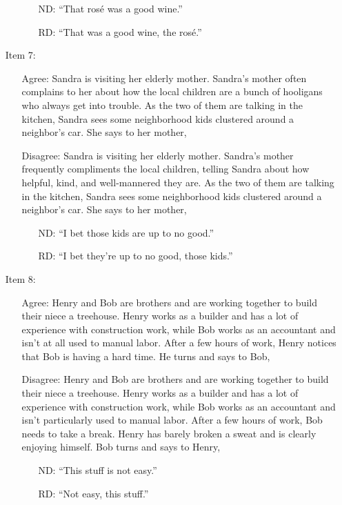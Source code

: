 \documentclass[titlepage,12pt]{article}
\begin{document}
\begin{appendices}
\begin{enumerate}
\begin{enumerate}
        \begin{itemize}
        \setlength{\itemindent}{5em}
            \item [ND:] ``That rosé was a good wine.''
            \item [RD:] ``That was a good wine, the rosé.''
        \end{itemize}
    \end{enumerate}
    \item [Item 7:]\hfill \begin{enumerate}
        \item [Agree:] Sandra is visiting her elderly mother. Sandra's mother often complains to her about how the local children are a bunch of hooligans who always get into trouble. As the two of them are talking in the kitchen, Sandra sees some neighborhood kids clustered around a neighbor's car. She says to her mother,
        \item [Disagree:] Sandra is visiting her elderly mother. Sandra's mother frequently compliments the local children, telling Sandra about how helpful, kind, and well-mannered they are. As the two of them are talking in the kitchen, Sandra sees some neighborhood kids clustered around a neighbor's car. She says to her mother,
        \begin{itemize}
        \setlength{\itemindent}{5em}
            \item [ND:] ``I bet those kids are up to no good.''
            \item [RD:] ``I bet they're up to no good, those kids.''
        \end{itemize}
    \end{enumerate}
    \item [Item 8:]\hfill 
    \begin{enumerate}
        \item [Agree:] Henry and Bob are brothers and are working together to build their niece a treehouse. Henry works as a builder and has a lot of experience with construction work, while Bob works as an accountant and isn't at all used to manual labor. After a few hours of work, Henry notices that Bob is having a hard time. He turns and says to Bob,
        \item [Disagree:] Henry and Bob are brothers and are working together to build their niece a treehouse. Henry works as a builder and has a lot of experience with construction work, while Bob works as an accountant and isn't particularly used to manual labor. After a few hours of work, Bob needs to take a break. Henry has barely broken a sweat and is clearly enjoying himself. Bob turns and says to Henry,
        \begin{itemize}
        \setlength{\itemindent}{5em}
            \item [ND:] ``This stuff is not easy.''
            \item [RD:] ``Not easy, this stuff.''
        \end{itemize}
    \end{enumerate}
\end{enumerate}


\end{appendices}
\end{document}
